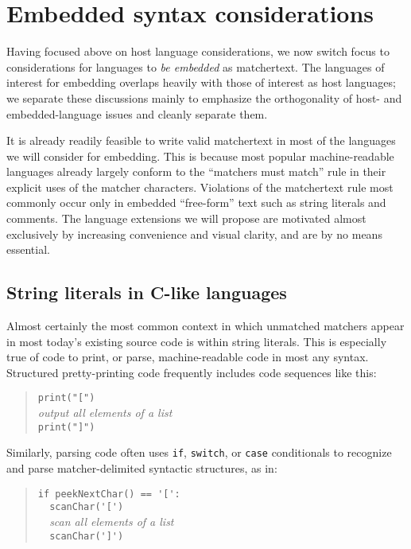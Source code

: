 \section{Embedded syntax considerations}
\label{sec:embed}

Having focused above on host language considerations,
we now switch focus to considerations for languages
to \emph{be embedded} as matchertext.
The languages of interest for embedding
overlaps heavily with those of interest as host languages;
we separate these discussions mainly to emphasize the orthogonality
of host- and embedded-language issues and cleanly separate them.

It is already readily feasible to write valid matchertext
in most of the languages we will consider for embedding.
This is because most popular machine-readable languages
already largely conform to the ``matchers must match'' rule
in their explicit uses of the matcher characters.
Violations of the matchertext rule most commonly occur
only in embedded ``free-form'' text such as string literals and comments.
The language extensions we will propose are motivated almost exclusively
by increasing convenience and visual clarity,
and are by no means essential.

\subsection{String literals in C-like languages}
\label{sec:embed:c}

Almost certainly the most common context in which unmatched matchers
appear in most today's existing source code is within string literals.
This is especially true of code to print, or parse,
machine-readable code in most any syntax.
Structured pretty-printing code frequently includes code sequences like this:

\begin{quote}
\verb|print("[")| \\
\emph{output all elements of a list} \\
\verb|print("]")|
\end{quote}

Similarly, parsing code often uses \verb|if|, \verb|switch|,
or \verb|case| conditionals
to recognize and parse matcher-delimited syntactic structures,
as in:

\begin{quote}
\verb|if peekNextChar() == '[':| \\
\verb|  scanChar('[')| \\
\verb|  |\emph{scan all elements of a list} \\
\verb|  scanChar(']')| 
\end{quote}

